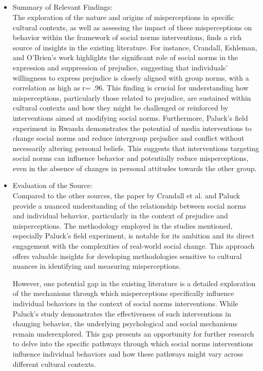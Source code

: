 \documentclass{article}
\begin{document}
\subsection{}
\begin{itemize}
    \item Summary of Relevant Findings:\\
The exploration of the nature and origins of misperceptions in specific cultural contexts, as well as assessing the impact of these misperceptions on behavior within the framework of social norms interventions, finds a rich source of insights in the existing literature. For instance, Crandall, Eshleman, and O'Brien's work highlights the significant role of social norms in the expression and suppression of prejudice, suggesting that individuals' willingness to express prejudice is closely aligned with group norms, with a correlation as high as r= .96. This finding is crucial for understanding how misperceptions, particularly those related to prejudice, are sustained within cultural contexts and how they might be challenged or reinforced by interventions aimed at modifying social norms. Furthermore, Paluck's field experiment in Rwanda demonstrates the potential of media interventions to change social norms and reduce intergroup prejudice and conflict without necessarily altering personal beliefs. This suggests that interventions targeting social norms can influence behavior and potentially reduce misperceptions, even in the absence of changes in personal attitudes towards the other group.
\end{itemize}
\begin{itemize}
    \item Evaluation of the Source:\\
Compared to the other sources, the paper by Crandall et al. and Paluck provide a nuanced understanding of the relationship between social norms and individual behavior, particularly in the context of prejudice and misperceptions. The methodology employed in the studies mentioned, especially Paluck's field experiment, is notable for its ambition and its direct engagement with the complexities of real-world social change. This approach offers valuable insights for developing methodologies sensitive to cultural nuances in identifying and measuring misperceptions.

However, one potential gap in the existing literature is a detailed exploration of the mechanisms through which misperceptions specifically influence individual behaviors in the context of social norms interventions. While Paluck's study demonstrates the effectiveness of such interventions in changing behavior, the underlying psychological and social mechanisms remain underexplored. This gap presents an opportunity for further research to delve into the specific pathways through which social norms interventions influence individual behaviors and how these pathways might vary across different cultural contexts.
\end{itemize}
\end{document}
